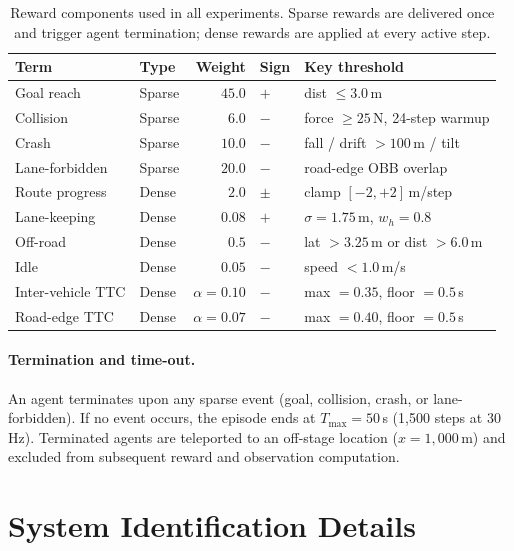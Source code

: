 \begin{table}[t]
  \centering\small
  \caption{Reward components used in all experiments.  Sparse rewards are delivered once and trigger agent termination; dense rewards are applied at every active step.}
  \label{tab:app_reward_terms}
  \begin{tabular}{@{}llrll@{}}
    \toprule
    Term & Type & Weight & Sign & Key threshold \\
    \midrule
    Goal reach         & Sparse & $45.0$  & $+$ & dist $\le 3.0$\,m \\
    Collision          & Sparse & $6.0$   & $-$ & force $\ge 25$\,N, 24-step warmup \\
    Crash              & Sparse & $10.0$  & $-$ & fall / drift $> 100$\,m / tilt \\
    Lane-forbidden     & Sparse & $20.0$  & $-$ & road-edge OBB overlap \\
    \midrule
    Route progress     & Dense  & $2.0$   & $\pm$ & clamp $[-2,+2]$\,m/step \\
    Lane-keeping       & Dense  & $0.08$  & $+$ & $\sigma{=}1.75$\,m, $w_h{=}0.8$ \\
    Off-road           & Dense  & $0.5$   & $-$ & lat $> 3.25$\,m or dist $> 6.0$\,m \\
    Idle               & Dense  & $0.05$  & $-$ & speed $< 1.0$\,m/s \\
    Inter-vehicle TTC  & Dense  & $\alpha{=}0.10$ & $-$ & max $= 0.35$, floor $= 0.5$\,s \\
    Road-edge TTC      & Dense  & $\alpha{=}0.07$ & $-$ & max $= 0.40$, floor $= 0.5$\,s \\
    \bottomrule
  \end{tabular}
\end{table}

\paragraph{Termination and time-out.}
An agent terminates upon any sparse event (goal, collision, crash, or lane-forbidden).
If no event occurs, the episode ends at $T_{\mathrm{max}} = 50$\,s (1{,}500 steps at 30\,Hz).
Terminated agents are teleported to an off-stage location ($x = 1{,}000$\,m) and excluded from subsequent reward and observation computation.


\section{System Identification Details}
\label{app:sysid}


